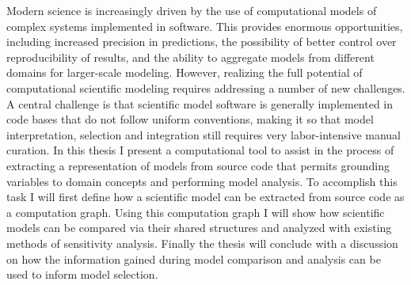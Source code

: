 
Modern science is increasingly driven by the use of computational models of complex systems implemented in software.
This provides enormous opportunities, including increased precision in predictions, the possibility of better control over reproducibility of results, and the ability to aggregate models from different domains for larger-scale modeling.
However, realizing the full potential of computational scientific modeling requires addressing a number of new challenges.
A central challenge is that scientific model software is generally implemented in code bases that do not follow uniform conventions, making it so that model interpretation, selection and integration still requires very labor-intensive manual curation.
In this thesis I present a computational tool to assist in the process of extracting a representation of models from source code that permits grounding variables to domain concepts and performing model analysis.
To accomplish this task I will first define how a scientific model can be extracted from source code as a computation graph.
Using this computation graph I will show how scientific models can be compared via their shared structures and analyzed with existing methods of sensitivity analysis.
Finally the thesis will conclude with a discussion on how the information gained during model comparison and analysis can be used to inform model selection.
